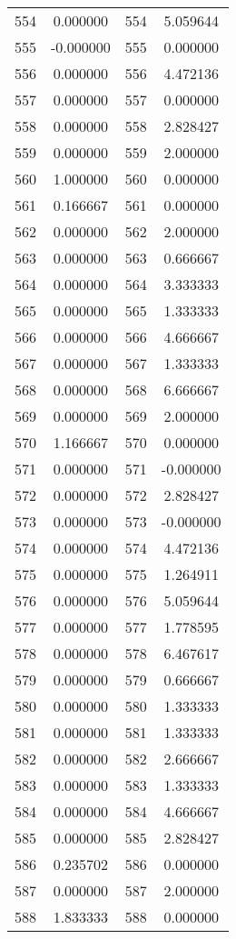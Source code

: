 \documentclass[12pt]{article}
\begin{document}
\begin{longtable}{@{}cccc@{}}
554 & 0.000000 & 554 & 5.059644 \\
555 & -0.000000 & 555 & 0.000000 \\
556 & 0.000000 & 556 & 4.472136 \\
557 & 0.000000 & 557 & 0.000000 \\
558 & 0.000000 & 558 & 2.828427 \\
559 & 0.000000 & 559 & 2.000000 \\
560 & 1.000000 & 560 & 0.000000 \\
561 & 0.166667 & 561 & 0.000000 \\
562 & 0.000000 & 562 & 2.000000 \\
563 & 0.000000 & 563 & 0.666667 \\
564 & 0.000000 & 564 & 3.333333 \\
565 & 0.000000 & 565 & 1.333333 \\
566 & 0.000000 & 566 & 4.666667 \\
567 & 0.000000 & 567 & 1.333333 \\
568 & 0.000000 & 568 & 6.666667 \\
569 & 0.000000 & 569 & 2.000000 \\
570 & 1.166667 & 570 & 0.000000 \\
571 & 0.000000 & 571 & -0.000000 \\
572 & 0.000000 & 572 & 2.828427 \\
573 & 0.000000 & 573 & -0.000000 \\
574 & 0.000000 & 574 & 4.472136 \\
575 & 0.000000 & 575 & 1.264911 \\
576 & 0.000000 & 576 & 5.059644 \\
577 & 0.000000 & 577 & 1.778595 \\
578 & 0.000000 & 578 & 6.467617 \\
579 & 0.000000 & 579 & 0.666667 \\
580 & 0.000000 & 580 & 1.333333 \\
581 & 0.000000 & 581 & 1.333333 \\
582 & 0.000000 & 582 & 2.666667 \\
583 & 0.000000 & 583 & 1.333333 \\
584 & 0.000000 & 584 & 4.666667 \\
585 & 0.000000 & 585 & 2.828427 \\
586 & 0.235702 & 586 & 0.000000 \\
587 & 0.000000 & 587 & 2.000000 \\
588 & 1.833333 & 588 & 0.000000 \\

\end{longtable}
\end{document}
